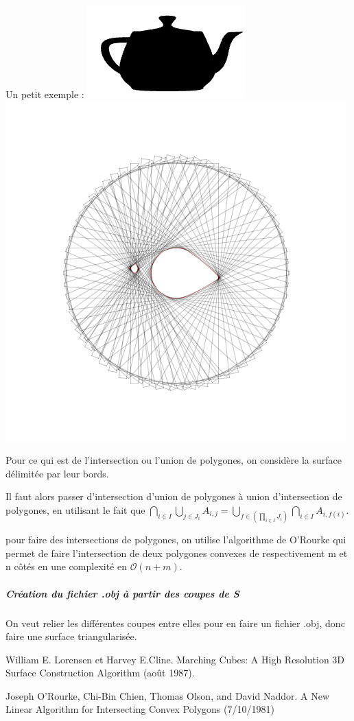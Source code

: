\documentclass{article}
\begin{document}
Un petit exemple : \includegraphics[scale=0.5]{14}\includegraphics[scale=0.25]{13}

Pour ce qui est de l'intersection ou l'union de polygones, on considère
la surface délimitée par leur bords.

Il faut alors passer d'intersection d'union de polygones à union d'intersection
de polygones, en utilisant le fait que $\bigcap_{i\in I}\bigcup_{j\in J_{i}}A_{i,j}=\bigcup_{f\in(\prod_{i\in I}J_{i})}\bigcap_{i\in I}A_{i,f(i)}$.

pour faire des intersections de polygones, on utilise l'algorithme
de O'Rourke \cite{key-1} qui permet de faire l'intersection de deux
polygones convexes de respectivement m et n côtés en une complexité
en $\mathcal{O}(n+m)$.

\subparagraph{Création du fichier .obj à partir des coupes de S}

On veut relier les différentes coupes entre elles pour en faire un
fichier .obj, donc faire une surface triangularisée.
\begin{thebibliography}{1}
    William E. Lorensen et Harvey E.Cline. Marching Cubes:
    A High Resolution 3D Surface Construction Algorithm (août 1987).
    
    Joseph O\textquoteright Rourke, Chi-Bin Chien, Thomas
    Olson, and David Naddor. A New Linear Algorithm for Intersecting Convex
    Polygons (7/10/1981)
\end{thebibliography}
\end{document}
